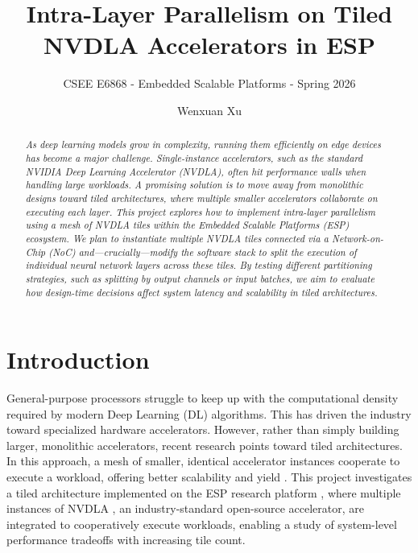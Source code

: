 \documentclass[10pt,sigconf,nonacm]{acmart}
\begin{document}
\title{Intra-Layer Parallelism on Tiled NVDLA Accelerators in ESP}
\subtitle{\normalsize CSEE E6868 - Embedded Scalable Platforms - Spring 2026}

\author{Wenxuan Xu}

\renewcommand{\shortauthors}{W. Xu}


\begin{abstract}
{\small\em
  As deep learning models grow in complexity, running them efficiently on edge devices has become a major challenge. Single-instance accelerators, such as the standard NVIDIA Deep Learning Accelerator (NVDLA), often hit performance walls when handling large workloads. A promising solution is to move away from monolithic designs toward tiled architectures, where multiple smaller accelerators collaborate on executing each layer. This project explores how to implement intra-layer parallelism using a mesh of NVDLA tiles within the Embedded Scalable Platforms (ESP) ecosystem. We plan to instantiate multiple NVDLA tiles connected via a Network-on-Chip (NoC) and—crucially—modify the software stack to split the execution of individual neural network layers across these tiles. By testing different partitioning strategies, such as splitting by output channels or input batches, we aim to evaluate how design-time decisions affect system latency and scalability in tiled architectures.
}
\end{abstract}

\maketitle

\section{Introduction}
\label{sec:intro}
General-purpose processors struggle to keep up with the computational density required by modern Deep Learning (DL) algorithms. This has driven the industry toward specialized hardware accelerators. However, rather than simply building larger, monolithic accelerators, recent research points toward tiled architectures. In this approach, a mesh of smaller, identical accelerator instances cooperate to execute a workload, offering better scalability and yield \cite{survey_accel}. This project investigates a tiled architecture implemented on the ESP research platform \cite{esp_iccad}, where multiple instances of NVDLA \cite{nvdla_web}, an industry-standard open-source accelerator, are integrated to cooperatively execute workloads, enabling a study of system-level performance tradeoffs with increasing tile count.
\end{document}
